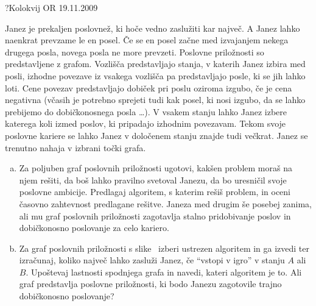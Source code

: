 \begin{naloga}{?}{Kolokvij OR 19.11.2009}
\begin{vprasanje}[poslovnez]
Janez je prekaljen poslovnež, ki hoče vedno zaslužiti kar največ.
A Janez lahko naenkrat prevzame le en posel.
Če se en posel začne med izvajanjem nekega drugega posla,
novega posla ne more prevzeti.
Poslovne priložnosti so predstavljene z grafom.
Vozlišča predstavljajo stanja, v katerih Janez izbira med posli,
izhodne povezave iz vsakega vozlišča pa predstavljajo posle,
ki se jih lahko loti.
Cene povezav predstavljajo dobiček pri poslu oziroma izgubo,
če je cena negativna
(včasih je potrebno sprejeti tudi kak posel, ki nosi izgubo,
da se lahko prebijemo do dobičkonosnega posla \dots).
V vsakem stanju lahko Janez izbere katerega koli izmed poslov,
ki pripadajo izhodnim povezavam.
Tekom svoje poslovne kariere se lahko Janez
v določenem stanju znajde tudi večkrat.
Janez se trenutno nahaja v izbrani točki grafa.
\begin{enumerate}[(a)]
\item Za poljuben graf poslovnih priložnosti ugotovi,
kakšen problem moraš na njem rešiti, da boš lahko pravilno svetoval Janezu,
da bo uresničil svoje poslovne ambicije.
Predlagaj algoritem, s katerim rešiš problem,
in oceni časovno zahtevnost predlagane rešitve.
Janeza med drugim še posebej zanima,
ali mu graf poslovnih priložnosti zagotavlja stalno pridobivanje poslov
in dobičkonosno poslovanje za celo kariero.
\item Za graf poslovnih priložnosti s slike~\fig{}
izberi ustrezen algoritem in ga izvedi ter izračunaj,
koliko največ lahko zasluži Janez, če ``vstopi v igro'' v stanju $A$ ali $B$.
Upoštevaj lastnosti spodnjega grafa in navedi, kateri algoritem je to.
Ali graf predstavlja poslovne priložnosti,
ki bodo Janezu zagotovile trajno dobičkonosno poslovanje?
\end{enumerate}

\begin{slika}
\pgfslika
{}
\end{slika}
\end{vprasanje}
\begin{odgovor}
\end{odgovor}
\end{naloga}


